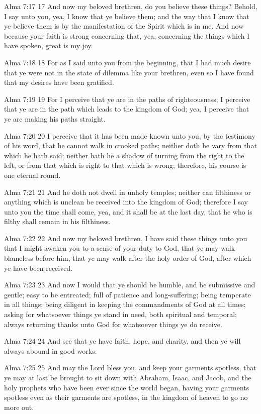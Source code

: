 Alma 7:17
 17 And now my beloved brethren, do you believe these things?
Behold, I say unto you, yea, I know that ye believe them; and the
way that I know that ye believe them is by the manifestation of
the Spirit which is in me. And now because your faith is strong
concerning that, yea, concerning the things which I have spoken,
great is my joy.

Alma 7:18
 18 For as I said unto you from the beginning, that I had much
desire that ye were not in the state of dilemma like your
brethren, even so I have found that my desires have been
gratified.

Alma 7:19
 19 For I perceive that ye are in the paths of righteousness; I
perceive that ye are in the path which leads to the kingdom of
God; yea, I perceive that ye are making his paths straight.

Alma 7:20
 20 I perceive that it has been made known unto you, by the
testimony of his word, that he cannot walk in crooked paths;
neither doth he vary from that which he hath said; neither hath
he a shadow of turning from the right to the left, or from that
which is right to that which is wrong; therefore, his course is
one eternal round.

Alma 7:21
 21 And he doth not dwell in unholy temples; neither can
filthiness or anything which is unclean be received into the
kingdom of God; therefore I say unto you the time shall come,
yea, and it shall be at the last day, that he who is filthy shall
remain in his filthiness.

Alma 7:22
 22 And now my beloved brethren, I have said these things unto
you that I might awaken you to a sense of your duty to God, that
ye may walk blameless before him, that ye may walk after the holy
order of God, after which ye have been received.

Alma 7:23
 23 And now I would that ye should be humble, and be submissive
and gentle; easy to be entreated; full of patience and
long-suffering; being temperate in all things; being diligent in
keeping the commandments of God at all times; asking for
whatsoever things ye stand in need, both spiritual and temporal;
always returning thanks unto God for whatsoever things ye do
receive.

Alma 7:24
 24 And see that ye have faith, hope, and charity, and then ye
will always abound in good works.

Alma 7:25
 25 And may the Lord bless you, and keep your garments spotless,
that ye may at last be brought to sit down with Abraham, Isaac,
and Jacob, and the holy prophets who have been ever since the
world began, having your garments spotless even as their garments
are spotless, in the kingdom of heaven to go no more out.

